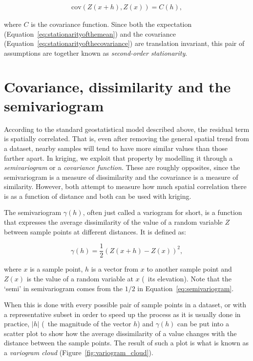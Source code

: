 \begin{align}
\label{eq:stationarityofthecovariance}
\mathrm{cov}\left(Z(x+h), Z(x)\right) = C(h),
\end{align}

where \(C\) is the covariance function.
Since both the expectation (Equation~\ref{eq:stationarityofthemean}) and the covariance (Equation~\ref{eq:stationarityofthecovariance}) are translation invariant, this pair of assumptions are together known as \emph{second-order stationarity}.

\section{Covariance, dissimilarity and the semivariogram}%

According to the standard geostatistical model described above, the residual term is spatially correlated.
That is, even after removing the general spatial trend from a dataset, nearby samples will tend to have more similar values than those farther apart.
In kriging, we exploit that property by modelling it through a \emph{semivariogram} or a \emph{covariance function}.
These are roughly opposites, since the semivariogram is a measure of dissimilarity and the covariance is a measure of similarity.
However, both attempt to measure how much spatial correlation there is as a function of distance and both can be used with kriging.

The semivariogram \(\gamma(h)\), often just called a variogram for short, is a function that expresses the average dissimilarity of the value of a random variable \(Z\) between sample points at different distances.
It is defined as:

\begin{equation}
\label{eq:semivariogram}
\gamma(h) = \frac{1}{2} (Z(x+h) - Z(x))^2,
\end{equation}

where \(x\) is a sample point, \(h\) is a vector from \(x\) to another sample point and \(Z(x)\) is the value of a random variable at \(x\) (\eg\ its elevation).
Note that the `semi' in semivariogram comes from the \(1/2\) in Equation~\ref{eq:semivariogram}.

When this is done with every possible pair of sample points in a dataset, or with a representative subset in order to speed up the process as it is usually done in practice, \(|h|\) (\ie\ the magnitude of the vector \(h\)) and \(\gamma(h)\) can be put into a scatter plot to show how the average dissimilarity of a value changes with the distance between the sample points.
The result of such a plot is what is known as a \emph{variogram cloud} (Figure~\ref{fig:variogram_cloud}).

